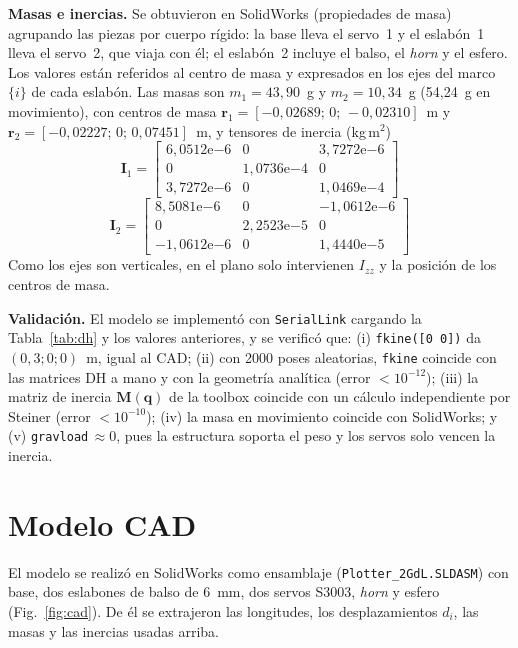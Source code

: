 \documentclass[10pt, letterpaper]{article}
\begin{document}
\textbf{Masas e inercias.} Se obtuvieron en SolidWorks (propiedades de masa) agrupando las piezas por cuerpo r\'igido: la base lleva el servo~1 y el eslab\'on~1 lleva el servo~2, que viaja con \'el; el eslab\'on~2 incluye el balso, el \textit{horn} y el esfero. Los valores est\'an referidos al centro de masa y expresados en los ejes del marco $\{i\}$ de cada eslab\'on. Las masas son $m_1=43{,}90$~g y $m_2=10{,}34$~g (54,24~g en movimiento), con centros de masa
$\mathbf{r}_1=[-0{,}02689;\,0;\,-0{,}02310]$~m y $\mathbf{r}_2=[-0{,}02227;\,0;\,0{,}07451]$~m, y tensores de inercia (kg\,m$^2$)
{\footnotesize
\begin{equation}
\mathbf{I}_1\!=\!\begin{bmatrix}6{,}0512\mathrm{e}{-6}&0&3{,}7272\mathrm{e}{-6}\\ 0&1{,}0736\mathrm{e}{-4}&0\\ 3{,}7272\mathrm{e}{-6}&0&1{,}0469\mathrm{e}{-4}\end{bmatrix}
\end{equation}
\begin{equation}
\mathbf{I}_2\!=\!\begin{bmatrix}8{,}5081\mathrm{e}{-6}&0&-1{,}0612\mathrm{e}{-6}\\ 0&2{,}2523\mathrm{e}{-5}&0\\ -1{,}0612\mathrm{e}{-6}&0&1{,}4440\mathrm{e}{-5}\end{bmatrix}
\end{equation}
}
Como los ejes son verticales, en el plano solo intervienen $I_{zz}$ y la posici\'on de los centros de masa.
 
\textbf{Validaci\'on.} El modelo se implement\'o con \texttt{SerialLink} cargando la Tabla~\ref{tab:dh} y los valores anteriores, y se verific\'o que: (i) \texttt{fkine([0 0])} da $(0{,}3;0;0)$~m, igual al CAD; (ii) con 2000 poses aleatorias, \texttt{fkine} coincide con las matrices DH a mano y con la geometr\'ia anal\'itica (error $<10^{-12}$); (iii) la matriz de inercia $\mathbf{M}(\mathbf{q})$ de la toolbox coincide con un c\'alculo independiente por Steiner (error $<10^{-10}$); (iv) la masa en movimiento coincide con SolidWorks; y (v) \texttt{gravload}$\,\approx 0$, pues la estructura soporta el peso y los servos solo vencen la inercia.
 
\section{Modelo CAD}
El modelo se realiz\'o en SolidWorks como ensamblaje (\texttt{Plotter\_2GdL.SLDASM}) con base, dos eslabones de balso de 6~mm, dos servos S3003, \textit{horn} y esfero (Fig.~\ref{fig:cad}). De \'el se extrajeron las longitudes, los desplazamientos $d_i$, las masas y las inercias usadas arriba.
 
\end{document}
